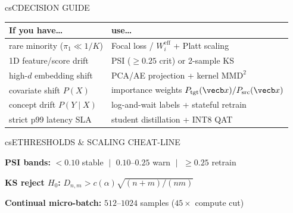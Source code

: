 \documentclass[../../../../master.tex]{subfiles}
\begin{document}
\begin{cscolumns}
\begin{cscard}{csC}{DECISION GUIDE}
  \renewcommand{\arraystretch}{1.15}\small
  \begin{tabular}{@{}>{\raggedright\arraybackslash}p{3.1cm}>{\raggedright\arraybackslash}p{4.8cm}@{}}
    \textbf{If you have\ldots} & \textbf{use\ldots}\\ \hline
    rare minority ($\pi_1\!\ll\!1/K$) & Focal loss / $W_i^{\mathrm{eff}}$ + Platt scaling\\
    1D feature/score drift & PSI ($\ge 0.25$ crit) or 2-sample KS\\
    high-$d$ embedding shift & PCA/AE projection + kernel $\mathrm{MMD}^2$\\
    covariate shift $P(X)$ & importance weights $P_{\mathrm{tgt}}(\vecb x)/P_{\mathrm{src}}(\vecb x)$\\
    concept drift $P(Y\mid X)$ & log-and-wait labels + stateful retrain\\
    strict p99 latency SLA & student distillation + INT8 QAT\\
  \end{tabular}
\end{cscard}

\begin{cscard}{csE}{THRESHOLDS \& SCALING CHEAT-LINE}
  \begin{csbul}
    \item \textbf{PSI bands:} $<0.10$ stable $\;\vert\;$ $0.10$--$0.25$ warn $\;\vert\;$ $\ge 0.25$ retrain
    \item \textbf{KS reject $H_0$:} $D_{n,m}>c(\alpha)\sqrt{(n+m)/(nm)}$
    \item \textbf{Continual micro-batch:} $512$--$1024$ samples ($45\times$ compute cut)
  \end{csbul}
\end{cscard}


\end{cscolumns}
\end{document}
